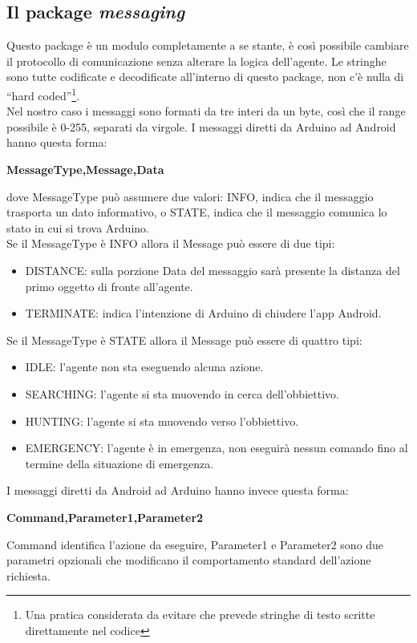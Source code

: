\subsection{Il package \textit{messaging}}
Questo package è un modulo completamente a se stante, è così possibile cambiare il
 protocollo di comunicazione senza alterare la logica dell'agente. Le stringhe sono 
 tutte codificate e decodificate all'interno di questo package, non c'è nulla di 
 ``hard coded''\footnote{Una pratica considerata da evitare che prevede stringhe di 
 testo scritte direttamente nel codice}.
 \\ Nel nostro caso i messaggi sono formati da tre interi da un byte, così che il 
 range possibile è 0-255, separati da virgole.
 I messaggi diretti da Arduino ad Android hanno questa forma:
 \begin{center}
 \textbf{MessageType,Message,Data}
 \end{center}
 dove MessageType può assumere due valori: INFO, indica che il messaggio trasporta un
 dato informativo, o STATE, indica che il messaggio comunica lo stato in cui si trova Arduino.
 \\Se il MessageType è INFO allora il Message può essere di due tipi: 
 \begin{itemize}\item DISTANCE: sulla porzione Data del messaggio sarà presente 
 la distanza del primo oggetto di fronte all'agente.
 \item TERMINATE: indica l'intenzione di Arduino di chiudere l'app Android.
 \end{itemize}
 Se il MessageType è STATE allora il Message può essere di quattro tipi: 
 \begin{itemize}
 	\item IDLE: l'agente non sta eseguendo alcuna azione.
 	\item SEARCHING: l'agente si sta muovendo in cerca dell'obbiettivo.
 	\item HUNTING: l'agente si sta muovendo verso l'obbiettivo.
 	\item EMERGENCY: l'agente è in emergenza, non eseguirà nessun comando fino al 
 	termine della situazione di emergenza. 
 \end{itemize}
  I messaggi diretti da Android ad Arduino hanno invece questa forma:
 \begin{center}
 \textbf{Command,Parameter1,Parameter2}
 \end{center}
 Command identifica l'azione da eseguire, Parameter1 e Parameter2 sono due parametri opzionali
 che modificano il comportamento standard dell'azione richiesta.
